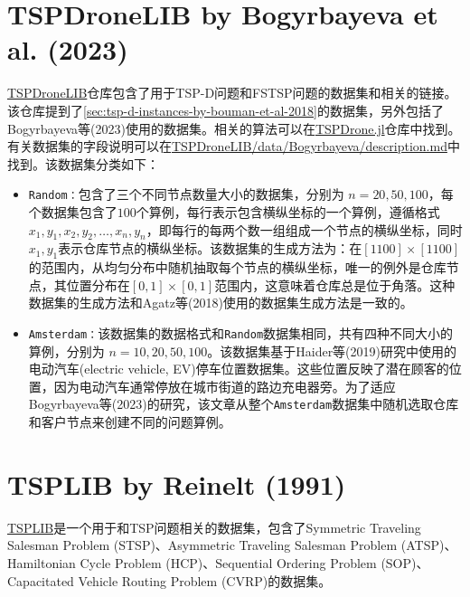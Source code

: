 \section{TSPDroneLIB by Bogyrbayeva et al. (2023)}
\href{https://github.com/chkwon/TSPDroneLIB}{TSPDroneLIB}仓库包含了用于TSP-D问题和FSTSP问题的数据集和相关的链接。该仓库提到了\ref{sec:tsp-d-instances-by-bouman-et-al-2018}的数据集，另外包括了Bogyrbayeva等(2023)\cite{bogyrbayevaDeepReinforcementLearning2023}使用的数据集。相关的算法可以在\href{https://github.com/chkwon/TSPDrone.jl}{TSPDrone.jl}仓库中找到。有关数据集的字段说明可以在\href{https://github.com/chkwon/TSPDroneLIB/blob/main/data/Bogyrbayeva/description.md}{TSPDroneLIB/data/Bogyrbayeva/description.md}中找到。该数据集分类如下：
\begin{itemize}
    \item \texttt{Random：}包含了三个不同节点数量大小的数据集，分别为 $n = 20, 50, 100$，每个数据集包含了$100$个算例，每行表示包含横纵坐标的一个算例，遵循格式 $x_1,y_1,x_2,y_2,\dots,x_n,y_n$，即每行的每两个数一组组成一个节点的横纵坐标，同时 $x_1,y_1$表示仓库节点的横纵坐标。该数据集的生成方法为：在$[1100]\times[1100]$的范围内，从均匀分布中随机抽取每个节点的横纵坐标，唯一的例外是仓库节点，其位置分布在$[0,1]\times[0,1]$范围内，这意味着仓库总是位于角落。这种数据集的生成方法和Agatz等(2018)\cite{agatzOptimizationApproachesTraveling2018}使用的数据集生成方法是一致的。
    \item \texttt{Amsterdam：}该数据集的数据格式和\texttt{Random}数据集相同，共有四种不同大小的算例，分别为 $n = 10, 20, 50, 100$。该数据集基于Haider等(2019)\cite{haiderOptimizingRelocationOperations2019}研究中使用的电动汽车(electric vehicle, EV)停车位置数据集。这些位置反映了潜在顾客的位置，因为电动汽车通常停放在城市街道的路边充电器旁。为了适应Bogyrbayeva等(2023)\cite{bogyrbayevaDeepReinforcementLearning2023}的研究，该文章从整个\texttt{Amsterdam}数据集中随机选取仓库和客户节点来创建不同的问题算例。
\end{itemize}

\section{TSPLIB by Reinelt (1991)}
\href{http://comopt.ifi.uni-heidelberg.de/software/TSPLIB95/}{TSPLIB}是一个用于和TSP问题相关的数据集，包含了Symmetric Traveling Salesman Problem (STSP)、Asymmetric Traveling Salesman Problem (ATSP)、Hamiltonian Cycle Problem (HCP)、Sequential Ordering Problem (SOP)、Capacitated Vehicle Routing Problem (CVRP)的数据集。
